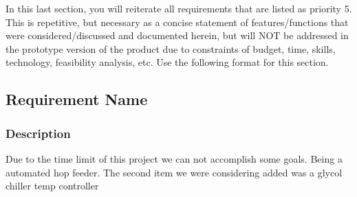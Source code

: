 In this last section, you will reiterate all requirements that are listed as priority 5. This is repetitive, but necessary as a concise statement of features/functions that were considered/discussed and documented herein, but will NOT be addressed in the prototype version of the product due to constraints of budget, time, skills, technology, feasibility analysis, etc. Use the following format for this section.

\subsection{Requirement Name}
\subsubsection{Description}
Due to the time limit of this project we can not accomplish some goals. Being a automated hop feeder. The second item we were considering added was a glycol chiller temp controller 